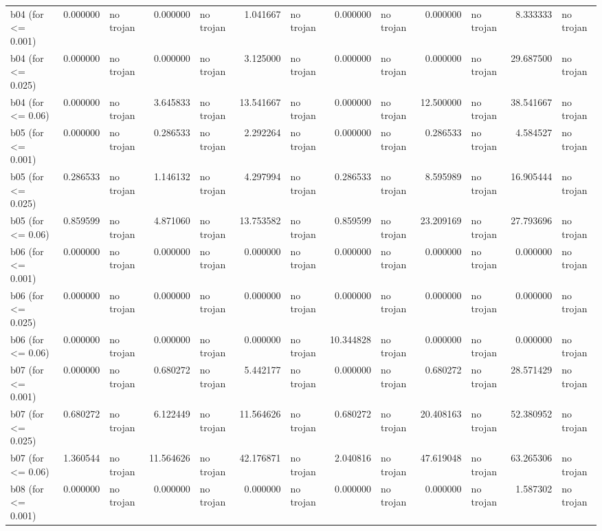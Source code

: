 \begin{tabular}{lrlrlrlrlrlrl}
b04
(for <= 0.001) & 0.000000 & no trojan & 0.000000 & no trojan & 1.041667 & no trojan & 0.000000 & no trojan & 0.000000 & no trojan & 8.333333 & no trojan \\
b04
(for <= 0.025) & 0.000000 & no trojan & 0.000000 & no trojan & 3.125000 & no trojan & 0.000000 & no trojan & 0.000000 & no trojan & 29.687500 & no trojan \\
b04
(for <= 0.06) & 0.000000 & no trojan & 3.645833 & no trojan & 13.541667 & no trojan & 0.000000 & no trojan & 12.500000 & no trojan & 38.541667 & no trojan \\
b05
(for <= 0.001) & 0.000000 & no trojan & 0.286533 & no trojan & 2.292264 & no trojan & 0.000000 & no trojan & 0.286533 & no trojan & 4.584527 & no trojan \\
b05
(for <= 0.025) & 0.286533 & no trojan & 1.146132 & no trojan & 4.297994 & no trojan & 0.286533 & no trojan & 8.595989 & no trojan & 16.905444 & no trojan \\
b05
(for <= 0.06) & 0.859599 & no trojan & 4.871060 & no trojan & 13.753582 & no trojan & 0.859599 & no trojan & 23.209169 & no trojan & 27.793696 & no trojan \\
b06
(for <= 0.001) & 0.000000 & no trojan & 0.000000 & no trojan & 0.000000 & no trojan & 0.000000 & no trojan & 0.000000 & no trojan & 0.000000 & no trojan \\
b06
(for <= 0.025) & 0.000000 & no trojan & 0.000000 & no trojan & 0.000000 & no trojan & 0.000000 & no trojan & 0.000000 & no trojan & 0.000000 & no trojan \\
b06
(for <= 0.06) & 0.000000 & no trojan & 0.000000 & no trojan & 0.000000 & no trojan & 10.344828 & no trojan & 0.000000 & no trojan & 0.000000 & no trojan \\
b07
(for <= 0.001) & 0.000000 & no trojan & 0.680272 & no trojan & 5.442177 & no trojan & 0.000000 & no trojan & 0.680272 & no trojan & 28.571429 & no trojan \\
b07
(for <= 0.025) & 0.680272 & no trojan & 6.122449 & no trojan & 11.564626 & no trojan & 0.680272 & no trojan & 20.408163 & no trojan & 52.380952 & no trojan \\
b07
(for <= 0.06) & 1.360544 & no trojan & 11.564626 & no trojan & 42.176871 & no trojan & 2.040816 & no trojan & 47.619048 & no trojan & 63.265306 & no trojan \\
b08
(for <= 0.001) & 0.000000 & no trojan & 0.000000 & no trojan & 0.000000 & no trojan & 0.000000 & no trojan & 0.000000 & no trojan & 1.587302 & no trojan \\

\end{tabular}
